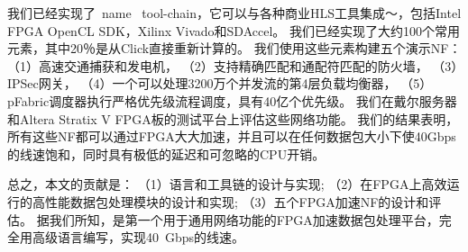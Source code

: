 我们已经实现了\ name \ tool-chain，它可以与各种商业HLS工具集成〜\cite {vivado,aoc}，包括Intel FPGA OpenCL SDK，Xilinx Vivado和SDAccel。
我们已经实现了大约100个常用元素，其中20％是从Click直接重新计算的。
我们使用这些元素构建五个演示NF：
（1）高速交通捕获和发电机，
（2）支持精确匹配和通配符匹配的防火墙，
（3）IPSec网关，
（4）一个可以处理3200万个并发流的第4层负载均衡器，
（5）pFabric调度器\cite {pfabric}执行严格优先级流程调度，具有40亿个优先级。
我们在戴尔服务器和Altera Stratix V FPGA板的测试平台上评估这些网络功能\cite {putnam2014reconfigurable}。
我们的结果表明，所有这些NF都可以通过FPGA大大加速，并且可以在任何数据包大小下使40Gbps的线速饱和，同时具有极低的延迟和可忽略的CPU开销。

总之，本文的贡献是：
（1）\name 语言和工具链的设计与实现;
（2）在FPGA上高效运行的高性能数据包处理模块的设计和实现;
（3）五个FPGA加速NF的设计和评估。
据我们所知，\name 是第一个用于通用网络功能的FPGA加速数据包处理平台，完全用高级语言编写，实现40~Gbps的线速。

